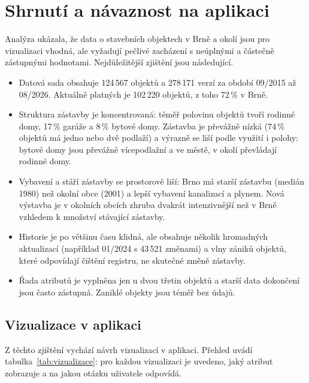 \section{Shrnutí a návaznost na aplikaci}

Analýza ukázala, že data o stavebních objektech v Brně a okolí jsou
pro vizualizaci vhodná, ale vyžadují pečlivé zacházení s neúplnými
a částečně zástupnými hodnotami. Nejdůležitější zjištění jsou následující.

\begin{itemize}
\item Datová sada obsahuje 124\,567 objektů a 278\,171 verzí za období
  09/2015 až 08/2026. Aktuálně platných je 102\,220 objektů, z toho 72\,\%
  v Brně.
\item Struktura zástavby je koncentrovaná: téměř polovinu objektů tvoří
  rodinné domy, 17\,\% garáže a 8\,\% bytové domy. Zástavba je převážně
  nízká (74\,\% objektů má jedno nebo dvě podlaží) a výrazně se liší
  podle využití i polohy: bytové domy jsou převážně vícepodlažní a ve městě,
  v okolí převládají rodinné domy.
\item Vybavení a stáří zástavby se prostorově liší: Brno má starší
  zástavbu (medián 1980) než okolní obce (2001) a lepší vybavení
  kanalizací a plynem. Nová výstavba je v okolních obcích zhruba dvakrát
  intenzivnější než v Brně vzhledem k množství stávající zástavby.
\item Historie je po většinu času klidná, ale obsahuje několik hromadných
  aktualizací (například 01/2024 s 43\,521 změnami) a vlny zániků objektů,
  které odpovídají čištění registru, ne skutečné změně zástavby.
\item Řada atributů je vyplněna jen u dvou třetin objektů a starší data
  dokončení jsou často zástupná. Zaniklé objekty jsou téměř bez údajů.
\end{itemize}

\subsection{Vizualizace v aplikaci}

Z těchto zjištění vychází návrh vizualizací v aplikaci. Přehled uvádí
tabulka~\ref{tab:vizualizace}: pro každou vizualizaci je uvedeno, jaký atribut
zobrazuje a na jakou otázku uživatele odpovídá.

